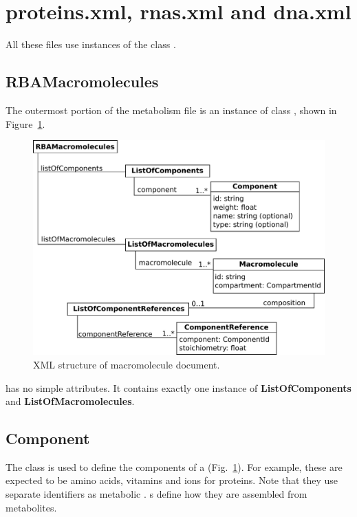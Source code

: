 
\section{proteins.xml, rnas.xml and dna.xml}

All these files use instances of the class \rbamacromolecules.


\subsection{RBAMacromolecules}
\label{sec:rba_macromolecules}

The outermost portion of the metabolism file is an instance of class
\rbamacromolecules, shown in Figure~\ref{fig:macromolecules}.

\begin{figure}
  \centering
  \includegraphics[scale=0.9]{figures/macromolecules}
  \caption{XML structure of macromolecule document.}
\label{fig:macromolecules}
\end{figure}

\rbamacromolecules{} has no simple attributes.
It contains exactly one instance of \textbf{ListOfComponents}
and \textbf{ListOfMacromolecules}.


\subsection{Component}
\label{sec:component}

The \component{} class is used to define the components of a \macromolecule{}
(Fig.~\ref{fig:macromolecules}).
For example, these are expected to be amino acids, vitamins and ions for
proteins.
Note that they use separate identifiers as metabolic \species.
\componentmap{}s define how they are assembled from metabolites.


